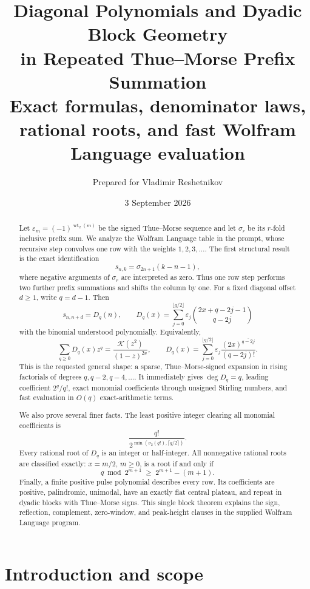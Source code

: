 \documentclass[11pt]{article}
\title{\textbf{Diagonal Polynomials and Dyadic Block Geometry\\
  in Repeated Thue--Morse Prefix Summation}\\[0.4em]
  \large Exact formulas, denominator laws, rational roots, and fast Wolfram Language evaluation}
\author{Prepared for Vladimir Reshetnikov}
\date{3 September 2026}
\theoremstyle{definition}
\theoremstyle{remark}
\newcommand{\eps}{\varepsilon}
\newcommand{\K}{\mathcal K}
\newcommand{\Diag}{D}
\newcommand{\rising}[2]{#1^{\overline{#2}}}
\newcommand{\wt}{\operatorname{wt}_2}
\newcommand{\vTwo}{\nu_2}
\begin{document}
\maketitle

\begin{abstract}
Let \(\eps_m=(-1)^{\wt(m)}\) be the signed Thue--Morse sequence and let
\(\sigma_r\) be its \(r\)-fold inclusive prefix sum.  We analyze the
Wolfram Language table in the prompt, whose recursive step convolves one row
with the weights \(1,2,3,\ldots\).  The first structural result is the exact
identification
\[
 s_{n,k}=\sigma_{2n+1}(k-n-1),
\]
where negative arguments of \(\sigma_r\) are interpreted as zero.  Thus one
row step performs two further prefix summations and shifts the column by one.
For a fixed diagonal offset \(d\geq1\), write \(q=d-1\).  Then
\[
 s_{n,n+d}=\Diag_q(n),
 \qquad
 \boxed{
 \Diag_q(x)=\sum_{j=0}^{\lfloor q/2\rfloor}
   \eps_j\binom{2x+q-2j-1}{q-2j}}
\]
with the binomial understood polynomially.  Equivalently,
\[
 \sum_{q\geq0}\Diag_q(x)z^q
  =\frac{\K(z^2)}{(1-z)^{2x}},
 \qquad
 \Diag_q(x)=\sum_{j=0}^{\lfloor q/2\rfloor}
 \eps_j\frac{\rising{(2x)}{q-2j}}{(q-2j)!}.
\]
This is the requested general shape: a sparse, Thue--Morse-signed expansion
in rising factorials of degrees \(q,q-2,q-4,\ldots\).  It immediately gives
\(\deg\Diag_q=q\), leading coefficient \(2^q/q!\), exact monomial
coefficients through unsigned Stirling numbers, and fast evaluation in
\(O(q)\) exact-arithmetic terms.

We also prove several finer facts.  The least positive integer clearing all
monomial coefficients is
\[
 \frac{q!}{2^{\min(\vTwo(q!),\lceil q/2\rceil)}}.
\]
Every rational root of \(\Diag_q\) is an integer or half-integer.  All
nonnegative rational roots are classified exactly: \(x=m/2\), \(m\geq0\),
is a root if and only if
\[
 q\bmod 2^{m+1}\;\geq\;2^{m+1}-(m+1).
\]
Finally, a finite positive pulse polynomial describes every row.  Its
coefficients are positive, palindromic, unimodal, have an exactly flat
central plateau, and repeat in dyadic blocks with Thue--Morse signs.  This
single block theorem explains the sign, reflection, complement, zero-window,
and peak-height clauses in the supplied Wolfram Language program.
\end{abstract}

\tableofcontents
\newpage

\section{Introduction and scope}
\end{document}
